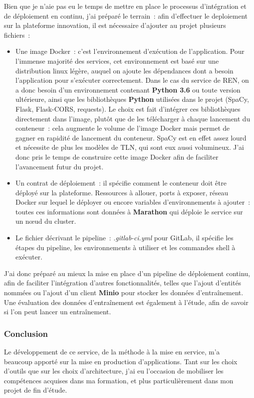 Bien que je n'aie pas eu le temps de mettre en place le processus d'intégration et de déploiement en continu, j'ai préparé le terrain~: afin d'effectuer le deploiement sur la plateforme innovation, il est nécessaire d'ajouter au projet plusieurs fichiers~:
\vspace{5pt}
\begin{itemize}
    \item Une image Docker~: c'est l'environnement d'exécution de l'application. Pour l'immense majorité des services, cet environnement est basé sur une distribution linux légère, auquel on ajoute les dépendances dont a besoin l'application pour s'exécuter correctement. Dans le cas du service de REN, on a donc besoin d'un environnement contenant \textbf{Python 3.6} ou toute version ultérieure, ainsi que les bibliothèques \textbf{Python} utilisées dans le projet (SpaCy, Flask, Flask-CORS, requests). Le choix est fait d'intégrer ces bibliothèques directement dans l'image, plutôt que de les télécharger à chaque lancement du conteneur~: cela augmente le volume de l'image Docker mais permet de gagner en rapidité de lancement du conteneur. SpaCy est en effet assez lourd et nécessite de plus les modèles de TLN, qui sont eux aussi volumineux. J'ai donc pris le temps de construire cette image Docker afin de faciliter l'avancement futur du projet.
    \vspace{5pt}
    \item Un contrat de déploiement~: il spécifie comment le conteneur doit être déployé sur la plateforme. Ressources à allouer, ports à exposer, réseau Docker sur lequel le déployer ou encore variables d'environnements à ajouter~: toutes ces informations sont données à \textbf{Marathon} qui déploie le service sur un nœud du cluster. 
    \vspace{5pt}
    \item Le fichier décrivant le pipeline~: \textit{.gitlab-ci.yml} pour GitLab, il spécifie les étapes du pipeline, les environnements à utiliser et les commandes shell à exécuter.
    \newline
\end{itemize}

J'ai donc préparé au mieux la mise en place d'un pipeline de déploiement continu, afin de faciliter l'intégration d'autres fonctionnalités, telles que l'ajout d'entités nommées ou l'ajout d'un client \textbf{Minio} pour stocker les données d'entraînement. Une évaluation des données d'entraînement est également à l'étude, afin de savoir si l'on peut lancer un entraînement.
\label{section 3.2.3}

\subsubsection*{Conclusion}
Le développement de ce service, de la méthode à la mise en service, m'a beaucoup apporté sur la mise en production d'applications. Tant sur les choix d'outils que sur les choix d'architecture, j'ai eu l'occasion de mobiliser les compétences acquises dans ma formation, et plus particulièrement dans mon projet de fin d'étude.
